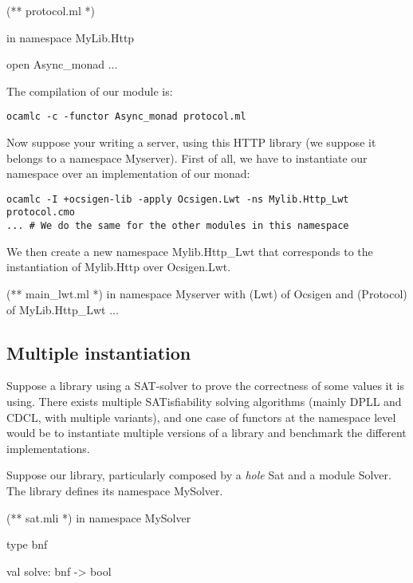 \documentclass[11pt,a4paper]{article}
\begin{document}
\medskip

\begin{OCaml}
(** protocol.ml *)

in namespace MyLib.Http

open Async_monad
...
\end{OCaml}

The compilation of our module is:

\begin{verbatim}
ocamlc -c -functor Async_monad protocol.ml
\end{verbatim}

\medskip

Now suppose your writing a server, using this HTTP library (we suppose it
belongs to a namespace Myserver). First of all, we have to instantiate our
namespace over an implementation of our monad:

\begin{verbatim}
ocamlc -I +ocsigen-lib -apply Ocsigen.Lwt -ns Mylib.Http_Lwt protocol.cmo
... # We do the same for the other modules in this namespace 
\end{verbatim}

We then create a new namespace Mylib.Http\_Lwt that corresponds to the
instantiation of Mylib.Http over Ocsigen.Lwt.

\begin{OCaml}
(** main_lwt.ml *)
in namespace Myserver
  with (Lwt) of Ocsigen
  and (Protocol) of MyLib.Http_Lwt
...
\end{OCaml}

\subsection{Multiple instantiation}

Suppose a library using a SAT-solver to prove the correctness of some values it
is using. There exists multiple SATisfiability solving algorithms (mainly DPLL
and CDCL, with multiple variants), and one case of functors at the namespace
level would be to instantiate multiple versions of a library and benchmark the
different implementations.

Suppose our library, particularly composed by a \emph{hole} Sat and a module
Solver. The library defines its namespace MySolver.

\begin{OCaml}
(** sat.mli *)
in namespace MySolver

type bnf

val solve: bnf -> bool
\end{OCaml}
\end{document}
